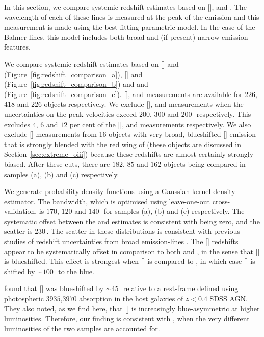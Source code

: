 In this section, we compare systemic redshift estimates based on [], \hb and \hans. 
The wavelength of each of these lines is measured at the peak of the emission and this measurement is made using the best-fitting parametric model. 
In the case of the Balmer lines, this model includes both broad and (if present) narrow emission features. 

We compare systemic redshift estimates based on [] and \hb (Figure~\ref{fig:redshift_comparison_a}), [] and \ha (Figure~\ref{fig:redshift_comparison_b}) and \hb and \ha (Figure~\ref{fig:redshift_comparison_c}). 
[], \hb and \ha measurements are available for $226$, $418$ and $226$ objects respectively. 
We exclude [], \hb and \ha measurements when the uncertainties on the peak velocities exceed $200$, $300$ and $200$\,\kms\, respectively. 
This excludes $4$, $6$ and $12$ per cent of the [], \hb and \ha measurements respectively. 
We also exclude [] measurements from 16 objects with very broad, blueshifted [] emission that is strongly blended with the red wing of \hb (these objects are discussed in Section~\ref{sec:extreme_oiii}) because these redshifts are almost certainly strongly biased.
After these cuts, there are $182$, $85$ and $162$ objects being compared in samples (a), (b) and (c) respectively. 

We generate probability density functions using a Gaussian kernel density estimator.
The bandwidth, which is optimised using leave-one-out cross-validation, is $170$, $120$ and $140$\,\kms\, for samples (a), (b) and (c) respectively. 
The systematic offset between the \ha and \hb estimates is consistent with being zero, and the scatter is $230$\,\kms. 
The scatter in these distributions is consistent with previous studies of redshift uncertainties from broad emission-lines \citep[e.g.][]{shen16b}. 
The [] redshifts appear to be systematically offset in comparison to both \ha and \hbns, in the sense that [] is blueshifted. 
This effect is strongest when [] is compared to \hbns, in which case [] is shifted by $\sim100$\,\kms\, to the blue.

\citet{hewett10} found that [] was blueshifted by $\sim45$\,\kms\, relative to a rest-frame defined using photospheric \ll$3935$,$3970$ absorption in the host galaxies of $z<0.4$ SDSS AGN. 
They also noted, as we find here, that [] is increasingly blue-asymmetric at higher luminosities. 
Therefore, our finding is consistent with \citet{hewett10}, when the very different luminosities of the two samples are accounted for.  

